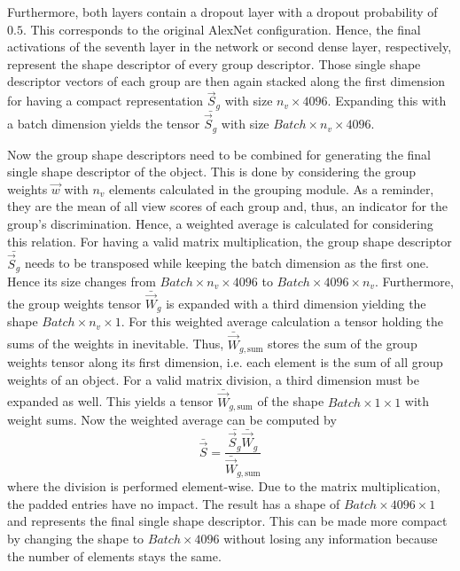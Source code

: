 Furthermore, both layers contain a dropout layer with a dropout probability of $0.5$.
This corresponds to the original AlexNet configuration.
Hence, the final activations of the seventh layer in the network or second dense layer, respectively, represent the shape descriptor of every group descriptor.
Those single shape descriptor vectors of each group are then again stacked along the first dimension for having a compact representation $\vec{S}_g$ with size $n_v \times 4096$.
Expanding this with a batch dimension yields the tensor $\bar{\vec{S}_g}$ with size $Batch \times n_v \times 4096$.

Now the group shape descriptors need to be combined for generating the final single shape descriptor of the object.
This is done by considering the group weights $\vec{w}$ with $n_v$ elements calculated in the grouping module.
As a reminder, they are the mean of all view scores of each group and, thus, an indicator for the group's discrimination.
Hence, a weighted average is calculated for considering this relation.
For having a valid matrix multiplication, the group shape descriptor $\bar{\vec{S}_g}$ needs to be transposed while keeping the batch dimension as the first one.
Hence its size changes from $Batch \times n_v \times 4096$ to $Batch \times 4096 \times n_v$.
Furthermore, the group weights tensor $\bar{\vec{W}}_g$ is expanded with a third dimension yielding the shape $Batch \times n_v \times 1$.
For this weighted average calculation a tensor holding the sums of the weights in inevitable.
Thus, $\bar{\vec{W}}_{g,\text{sum}}$ stores the sum of the group weights tensor along its first dimension, i.e. each element is the sum of all group weights of an object.
For a valid matrix division, a third dimension must be expanded as well.
This yields a tensor $\bar{\vec{W}}_{g,\text{sum}}$ of the shape $Batch \times 1 \times 1$ with weight sums.
Now the weighted average can be computed by
\begin{equation}
	\bar{\vec{S}} = \frac{\bar{\vec{S}_g} \bar{\vec{W}}_g} {\bar{\vec{W}}_{g,\text{sum}}}
\end{equation}
where the division is performed element-wise.
Due to the matrix multiplication, the padded entries have no impact.
The result has a shape of $Batch \times 4096 \times 1$ and represents the final single shape descriptor.
This can be made more compact by changing the shape to $Batch \times 4096$ without losing any information because the number of elements stays the same.

